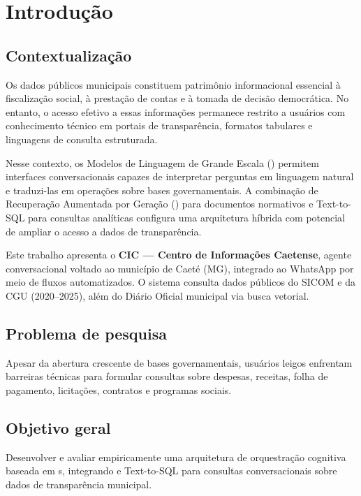 \chapter{Introdução}

\section{Contextualização}

Os dados públicos municipais constituem patrimônio informacional essencial à fiscalização social, à prestação de contas e à tomada de decisão democrática. No entanto, o acesso efetivo a essas informações permanece restrito a usuários com conhecimento técnico em portais de transparência, formatos tabulares e linguagens de consulta estruturada.

Nesse contexto, os Modelos de Linguagem de Grande Escala () permitem interfaces conversacionais capazes de interpretar perguntas em linguagem natural e traduzi-las em operações sobre bases governamentais. A combinação de Recuperação Aumentada por Geração () para documentos normativos e Text-to-SQL para consultas analíticas configura uma arquitetura híbrida com potencial de ampliar o acesso a dados de transparência.

Este trabalho apresenta o \textbf{CIC --- Centro de Informações Caetense}, agente conversacional voltado ao município de Caeté (MG), integrado ao WhatsApp por meio de fluxos automatizados. O sistema consulta dados públicos do SICOM e da CGU (2020--2025), além do Diário Oficial municipal via busca vetorial.

\section{Problema de pesquisa}

Apesar da abertura crescente de bases governamentais, usuários leigos enfrentam barreiras técnicas para formular consultas sobre despesas, receitas, folha de pagamento, licitações, contratos e programas sociais.

\section{Objetivo geral}

Desenvolver e avaliar empiricamente uma arquitetura de orquestração cognitiva baseada em s, integrando  e Text-to-SQL para consultas conversacionais sobre dados de transparência municipal.

